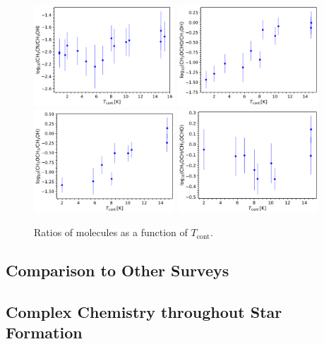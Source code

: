 \documentclass[twocolumn]{aastex62}
\begin{document}
\begin{figure}[htbp!]
  \centering
  \includegraphics[width=0.47\textwidth]{ratio_ch3cn_ch3oh_tcont.pdf}
  \includegraphics[width=0.47\textwidth]{ratio_ch3ocho_ch3oh_tcont.pdf}
  \includegraphics[width=0.47\textwidth]{ratio_ch3och3_ch3oh_tcont.pdf}
  \includegraphics[width=0.47\textwidth]{ratio_ch3och3_ch3ocho_tcont.pdf}
  \caption{Ratios of molecules as a function of $T_\text{cont}$.}
  \label{fig:ratio_tcont}
\end{figure}
\subsection{Comparison to Other Surveys}
\subsection{Complex Chemistry throughout Star Formation}
\end{document}
